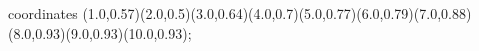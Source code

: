 					coordinates { (1.0,0.57)(2.0,0.5)(3.0,0.64)(4.0,0.7)(5.0,0.77)(6.0,0.79)(7.0,0.88)(8.0,0.93)(9.0,0.93)(10.0,0.93)};